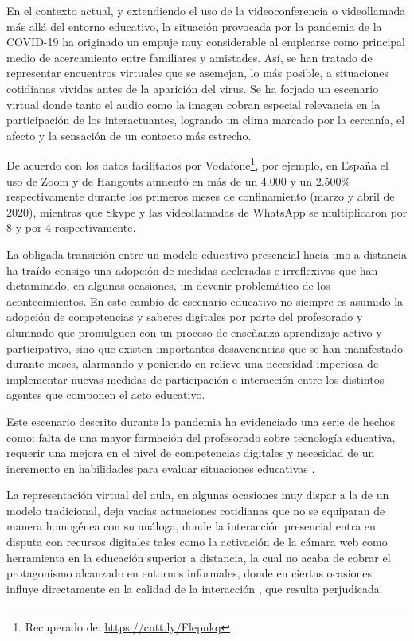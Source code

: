 \documentclass[spanish]{textolivre}
\begin{document}
En el contexto actual, y extendiendo el uso de la videoconferencia o videollamada más allá del entorno educativo, la situación provocada por la pandemia de la COVID-19 ha originado un empuje muy considerable al emplearse como principal medio de acercamiento entre familiares y amistades. Así, se han tratado de representar encuentros virtuales que se asemejan, lo más posible, a situaciones cotidianas vividas antes de la aparición del virus. Se ha forjado un escenario virtual donde tanto el audio como la imagen cobran especial relevancia en la participación de los interactuantes, logrando un clima marcado por la cercanía, el afecto y la sensación de un contacto más estrecho.

De acuerdo con los datos facilitados por Vodafone\footnote{Recuperado de: \url{https://cutt.ly/Flepnkq}}, por ejemplo, en España el uso de Zoom y de Hangouts aumentó en más de un 4.000 y un 2.500\% respectivamente durante los primeros meses de confinamiento (marzo y abril de 2020), mientras que Skype y las videollamadas de WhatsApp se multiplicaron por 8 y por 4 respectivamente.

La obligada transición entre un modelo educativo presencial hacia uno a distancia ha traído consigo una adopción de medidas aceleradas e irreflexivas que han dictaminado, en algunas ocasiones, un devenir problemático de los acontecimientos. En este cambio de escenario educativo no siempre es asumido la adopción de competencias y saberes digitales por parte del profesorado y alumnado que promulguen con un proceso de enseñanza aprendizaje activo y participativo, sino que existen importantes desavenencias que se han manifestado durante meses, alarmando y poniendo en relieve una necesidad imperiosa de implementar nuevas medidas de participación e interacción entre los distintos agentes que componen el acto educativo.

Este escenario descrito durante la pandemia ha evidenciado una serie de hechos como: falta de una mayor formación del profesorado sobre tecnología educativa, requerir una mejora en el nivel de competencias digitales y necesidad de un incremento en habilidades para evaluar situaciones educativas \cite{area_tecnologias_2021}.

La representación virtual del aula, en algunas ocasiones muy dispar a la de un modelo tradicional, deja vacías actuaciones cotidianas que no se equiparan de manera homogénea con su análoga, donde la interacción presencial entra en disputa con recursos digitales tales como la activación de la cámara web como herramienta en la educación superior a distancia, la cual no acaba de cobrar el protagonismo alcanzado en entornos informales, donde en ciertas ocasiones influye directamente en la calidad de la interacción \cite{brodie_consumer_2013,goldman_balancing_2011}, que resulta perjudicada.
\end{document}
